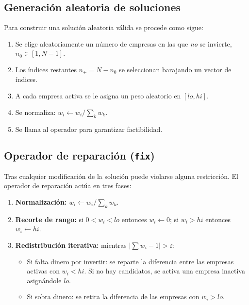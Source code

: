 \documentclass[12pt,a4paper]{article}
\begin{document}
\subsection{Generación aleatoria de soluciones}

Para construir una solución aleatoria válida se procede como sigue:

\begin{enumerate}
  \item Se elige aleatoriamente un número de empresas en las que \emph{no} se invierte,
        $n_0 \in [1, N{-}1]$.
  \item Los índices restantes $n_+ = N - n_0$ se seleccionan barajando un vector de índices.
  \item A cada empresa activa se le asigna un peso aleatorio en $[lo, hi]$.
  \item Se normaliza: $w_i \leftarrow w_i / \sum_k w_k$.
  \item Se llama al operador \fix{} para garantizar factibilidad.
\end{enumerate}

\subsection{Operador de reparación (\texttt{fix})}

Tras cualquier modificación de la solución puede violarse alguna restricción.
El operador de reparación actúa en tres fases:

\begin{enumerate}
  \item \textbf{Normalización:} $w_i \leftarrow w_i / \sum_k w_k$.
  \item \textbf{Recorte de rango:} si $0 < w_i < lo$ entonces $w_i \leftarrow 0$;
        si $w_i > hi$ entonces $w_i \leftarrow hi$.
  \item \textbf{Redistribución iterativa:} mientras $|\sum w_i - 1| > \varepsilon$:
        \begin{itemize}
          \item Si falta dinero por invertir: se reparte la diferencia entre las empresas
                activas con $w_i < hi$. Si no hay candidatos, se activa una empresa
                inactiva asignándole $lo$.
          \item Si sobra dinero: se retira la diferencia de las empresas con $w_i > lo$.
        \end{itemize}
\end{enumerate}
\end{document}

